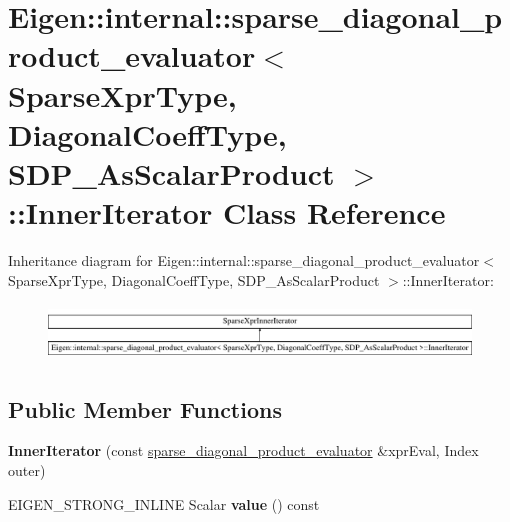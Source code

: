 \hypertarget{class_eigen_1_1internal_1_1sparse__diagonal__product__evaluator_3_01_sparse_xpr_type_00_01_diagocbb91bd40f7346bf4110a7aa087884f6}{}\section{Eigen\+::internal\+::sparse\+\_\+diagonal\+\_\+product\+\_\+evaluator$<$ Sparse\+Xpr\+Type, Diagonal\+Coeff\+Type, S\+D\+P\+\_\+\+As\+Scalar\+Product $>$\+::Inner\+Iterator Class Reference}
\label{class_eigen_1_1internal_1_1sparse__diagonal__product__evaluator_3_01_sparse_xpr_type_00_01_diagocbb91bd40f7346bf4110a7aa087884f6}
Inheritance diagram for Eigen\+::internal\+::sparse\+\_\+diagonal\+\_\+product\+\_\+evaluator$<$ Sparse\+Xpr\+Type, Diagonal\+Coeff\+Type, S\+D\+P\+\_\+\+As\+Scalar\+Product $>$\+::Inner\+Iterator\+:\begin{figure}[H]
\begin{center}
\leavevmode
\includegraphics[height=1.489362cm]{class_eigen_1_1internal_1_1sparse__diagonal__product__evaluator_3_01_sparse_xpr_type_00_01_diagocbb91bd40f7346bf4110a7aa087884f6}
\end{center}
\end{figure}
\subsection*{Public Member Functions}
\begin{DoxyCompactItemize}
\item 
\mbox{\label{class_eigen_1_1internal_1_1sparse__diagonal__product__evaluator_3_01_sparse_xpr_type_00_01_diagocbb91bd40f7346bf4110a7aa087884f6_a0009088b546fdb4f261d1c91553f9824}} 
{\bfseries Inner\+Iterator} (const \mbox{\hyperlink{struct_eigen_1_1internal_1_1sparse__diagonal__product__evaluator}{sparse\+\_\+diagonal\+\_\+product\+\_\+evaluator}} \&xpr\+Eval, Index outer)
\item 
\mbox{\label{class_eigen_1_1internal_1_1sparse__diagonal__product__evaluator_3_01_sparse_xpr_type_00_01_diagocbb91bd40f7346bf4110a7aa087884f6_ac10ad8f6ab6f49094bae27a2fda77ce0}} 
E\+I\+G\+E\+N\+\_\+\+S\+T\+R\+O\+N\+G\+\_\+\+I\+N\+L\+I\+NE Scalar {\bfseries value} () const
\end{DoxyCompactItemize}
